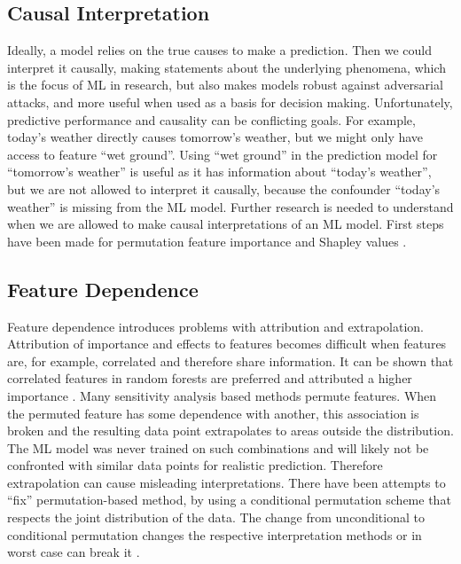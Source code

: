 \documentclass[runningheads]{llncs}
\begin{document}
\subsection{Causal Interpretation}
Ideally, a model relies on the true causes to make a prediction.
Then we could  interpret it causally, making statements about the underlying phenomena, which is the focus of ML in research, but also makes models robust against adversarial attacks, and more useful when used as a basis for decision making.
Unfortunately, predictive performance and causality can be conflicting goals.
For example, today's weather directly causes tomorrow's weather, but we might only have access to feature \enquote{wet ground}.
Using \enquote{wet ground} in the prediction model for \enquote{tomorrow's weather} is useful as it has information about \enquote{today's weather}, but we are not allowed to interpret it causally, because the confounder \enquote{today's weather} is missing from the ML model.
Further research is needed to understand when we are allowed to make causal interpretations of an ML model.
First steps have been made for permutation feature importance \cite{konig2020relative} and Shapley values \cite{ma2020predictive}.

\subsection{Feature Dependence}

Feature dependence introduces problems with attribution and extrapolation.
Attribution of importance and effects to features becomes difficult when features are, for example, correlated and therefore share information.
It can be shown that correlated features in random forests are preferred and attributed a higher importance \cite{strobl2008conditional,hooker2019please}.
Many sensitivity analysis based methods permute features.
When the permuted feature has some dependence with another, this association is broken and the resulting data point extrapolates to areas outside the distribution.
The ML model was never trained on such combinations and will likely not be confronted with similar data points for realistic prediction.
Therefore extrapolation can cause misleading interpretations.
There have been attempts to \enquote{fix} permutation-based method, by using a conditional permutation scheme that respects the joint distribution of the data.
The change from unconditional to conditional permutation changes the respective interpretation methods \cite{molnar2020model,apley2016visualizing} or in worst case can break it \cite{janzing2019feature,sundararajan2019many}.
\end{document}
